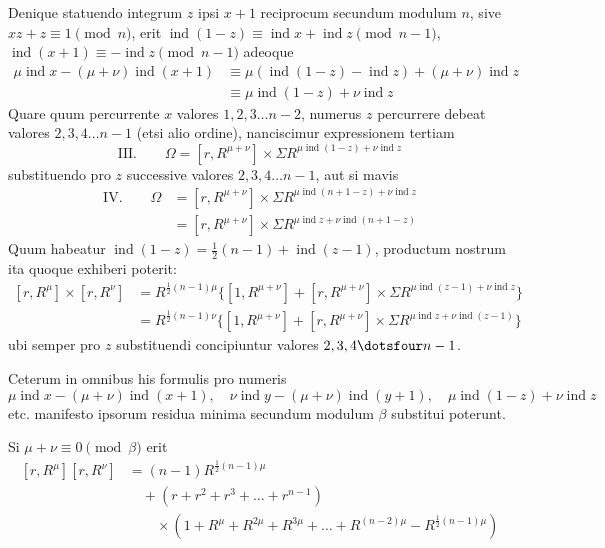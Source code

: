 Denique statuendo integrum $z$ ipsi $x+1$ reciprocum secundum 
modulum $n$, sive $xz+z\equiv1\pmod n$, erit $\operatorname{ind}(1-z)\equiv\operatorname{ind}x+\operatorname{ind}z\pmod{n-1}$, $\operatorname{ind}(x+1)\equiv-\operatorname{ind}z\pmod{n-1}$ adeoque
\[
\begin{aligned}
\mu\operatorname{ind}x-(\mu+\nu)\operatorname{ind}(x+1)&\equiv\mu(\operatorname{ind}(1-z)-\operatorname{ind}z)+(\mu+\nu)\operatorname{ind}z\\
&\equiv\mu\operatorname{ind}(1-z)+\nu\operatorname{ind}z
\end{aligned}
\]
Quare quum percurrente $x$ valores $1,2,3\dots n-2$, numerus $z$ percurrere debeat valores $2,3,4\dots n-1$ (etsi alio ordine), nanciscimur expressionem tertiam
\[
\text{III.}\qquad\Omega=[r,R^{\mu+\nu}]\times\Sigma R^{\mu\operatorname{ind}(1-z)+\nu\operatorname{ind}z}
\]
substituendo pro $z$ successive valores $2,3,4\dots n-1$, aut si mavis
\[
\begin{aligned}
\text{IV.}\qquad\Omega&=[r,R^{\mu+\nu}]\times\Sigma R^{\mu\operatorname{ind}(n+1-z)+\nu\operatorname{ind}z}\\
&=[r,R^{\mu+\nu}]\times\Sigma R^{\mu\operatorname{ind}z+\nu\operatorname{ind}(n+1-z)}
\end{aligned}
\]
Quum habeatur $\operatorname{ind}(1-z)=\frac12(n-1)+\operatorname{ind}(z-1)$, productum nostrum ita quoque exhiberi poterit:
\[
\begin{aligned}
[r,R^\mu]\times[r,R^\nu]&=R^{\frac12(n-1)\mu}\{[1,R^{\mu+\nu}]+[r,R^{\mu+\nu}]\times\Sigma R^{\mu\operatorname{ind}(z-1)+\nu\operatorname{ind}z}\}\\
&=R^{\frac12(n-1)\nu}\{[1,R^{\mu+\nu}]+[r,R^{\mu+\nu}]\times\Sigma R^{\mu\operatorname{ind}z+\nu\operatorname{ind}(z-1)}\}
\end{aligned}
\]
ubi semper pro $z$ substituendi concipiuntur valores $2,3,4\dotsfour n-1$.

Ceterum in omnibus his formulis pro numeris
\[
\mu\operatorname{ind}x-(\mu+\nu)\operatorname{ind}(x+1),\quad\nu\operatorname{ind}y-(\mu+\nu)\operatorname{ind}(y+1),\quad\mu\operatorname{ind}(1-z)+\nu\operatorname{ind}z
\]
etc. manifesto ipsorum residua minima secundum modulum $\beta$ substitui poterunt.

Si $\mu+\nu\equiv0\pmod\beta$ erit
\[
\begin{aligned}
[r,R^\mu][r,R^\nu]&=(n-1)R^{\frac12(n-1)\mu}\\
&\quad+(r+r^2+r^3+\dots+r^{n-1})\\
&\qquad\times(1+R^\mu+R^{2\mu}+R^{3\mu}+\dots+R^{(n-2)\mu}-R^{\frac12(n-1)\mu})
\end{aligned}
\]

